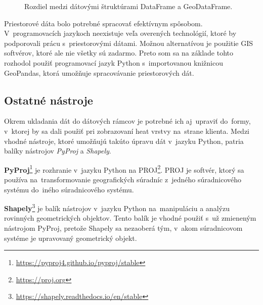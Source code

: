 \begin{figure}[ht]
    \centering
    \qquad
    \caption{Rozdiel medzi dátovými štruktúrami DataFrame a GeoDataFrame.}
    \label{fig:dataframes}
\end{figure}

Priestorové dáta bolo potrebné spracovať efektívnym spôsobom. V~programovacích jazykoch neexistuje veľa overených technológií, ktoré by podporovali prácu s~priestorovými dátami. Možnou alternatívou je použitie GIS softvérov, ktoré ale nie všetky sú zadarmo. Preto som sa na základe tohto rozhodol použiť programovací jazyk Python s~importovanou knižnicou GeoPandas, ktorá umožňuje spracovávanie priestorových dát.

\subsection{Ostatné nástroje}
Okrem ukladania dát do dátových rámcov je potrebné ich aj~upraviť do~formy, v~ktorej by sa dali použiť pri zobrazovaní heat vrstvy na~strane klienta. Medzi vhodné nástroje, ktoré umožňujú takúto úpravu dát v~jazyku Python, patria balíky nástrojov \emph{PyProj} a \emph{Shapely}.

\textbf{PyProj}\footnote{\url{https://pyproj4.github.io/pyproj/stable}} je rozhranie v~jazyku Python na PROJ\footnote{\url{https://proj.org}}. PROJ je softvér, ktorý sa používa na~transformovanie geografických súradníc z~jedného súradnicového systému do~iného súradnicového systému.

\textbf{Shapely}\footnote{\url{https://shapely.readthedocs.io/en/stable}} je balík nástrojov v~jazyku Python na~manipuláciu a analýzu rovinných geometrických objektov. Tento balík je vhodné použiť s~už zmieneným nástrojom PyProj, pretože Shapely sa nezaoberá tým, v~akom súradnicovom systéme je upravovaný geometrický objekt. 

